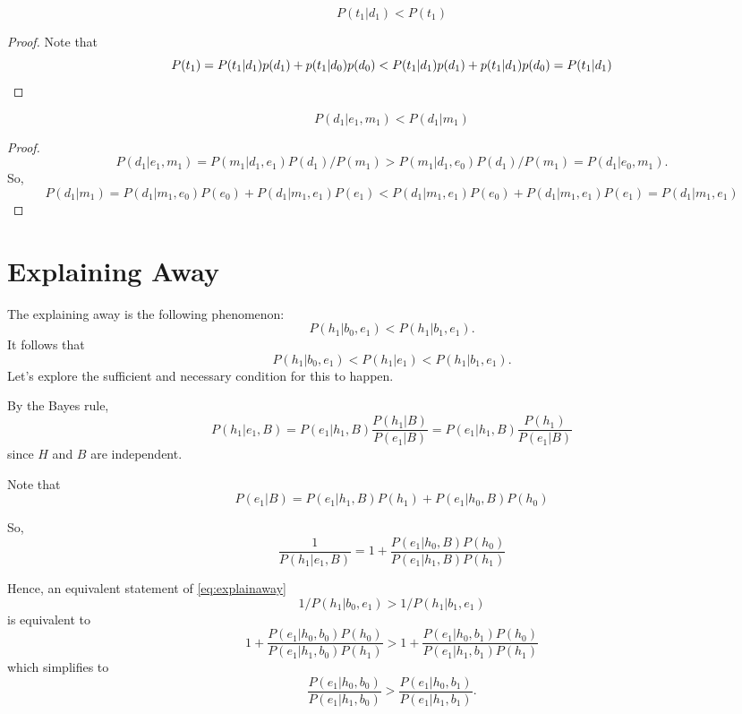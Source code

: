 \documentclass{discussion}
\begin{document}
\begin{corollary}
\[	P(t_1 | d_1) < P(t_1)\]
\end{corollary}
\begin{proof}
	Note that 
	\[P(t_1) = P(t_1 | d_1) p(d_1) + p(t_1 | d_0) p(d_0) < P(t_1 | d_1) p(d_1) + p(t_1 | d_1) p(d_0) = P(t_1 | d_1)\qedhere\]
\end{proof}

\begin{lemma}
\[	P(d_1 | e_1, m_1) < P(d_1 | m_1)\]
\end{lemma}
\begin{proof}
\[	P(d_1 | e_1, m_1)
 = P(m_1 | d_1, e_1) P(d_1) / P(m_1)
 > P(m_1 | d_1, e_0) P(d_1) / P(m_1)
 = P(d_1 | e_0, m_1).
\]
So,
\[P(d_1 | m_1) = P(d_1 | m_1, e_0) P(e_0) + P(d_1 | m_1, e_1)P(e_1) < P(d_1 | m_1, e_1) P(e_0) + P(d_1 | m_1, e_1)P(e_1) = P(d_1 | m_1,e_1)\]
\end{proof}

\section{Explaining Away}
The explaining away is the following phenomenon:
\begin{equation}
\label{eq:explainaway}
	P(h_1 | b_0, e_1) < P(h_1 | b_1, e_1).
\end{equation}
It follows that
\[P(h_1 | b_0, e_1) < P(h_1 | e_1)< P(h_1 | b_1, e_1).\]
Let's explore the sufficient and necessary condition for this to happen.

By the Bayes rule,
\[P(h_1 | e_1, B) = P(e_1 | h_1, B) \frac{P(h_1 | B)}{P(e_1 | B)} = P(e_1 | h_1, B) \frac{P(h_1)}{P(e_1 | B)}\]
since $H$ and $B$ are independent.



Note that
\[P(e_1 | B) = P(e_1 | h_1, B)P(h_1) + P(e_1 | h_0, B)P(h_0)\]

So, 
\[\frac{1}{P(h_1|e_1,B)}
= 1 + \frac{P(e_1 | h_0, B)P(h_0)}{P(e_1|h_1,B)P(h_1)}\]

Hence, an equivalent statement of \eqref{eq:explainaway}
\[	1/P(h_1 | b_0, e_1) > 1/P(h_1 | b_1, e_1)
\]
is equivalent to 
\[1 + \frac{P(e_1 | h_0, b_0)P(h_0)}{P(e_1|h_1,b_0)P(h_1)} > 1 + \frac{P(e_1 | h_0, b_1)P(h_0)}{P(e_1|h_1,b_1)P(h_1)}
\]
which simplifies to
\[\frac{P(e_1 | h_0, b_0)}{P(e_1|h_1,b_0)} > \frac{P(e_1 | h_0, b_1)}{P(e_1|h_1,b_1)}.\]
\end{document}
